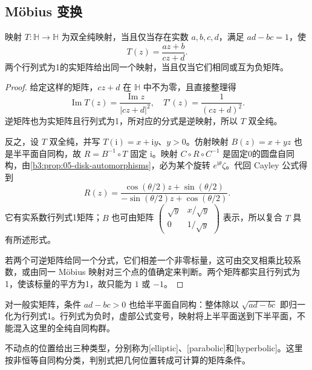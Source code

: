 \subsection{Möbius 变换}
\label{b3:subsec:110402}

\begin{proposition}[上半平面自同构]\label{b3:prop:11-halfplane-automorphisms}
映射 \(T:\mathbb H\to\mathbb H\) 为双全纯映射，当且仅当存在实数 \(a,b,c,d\)，满足 \(ad-bc=1\)，使
\[
 T(z)=\frac{az+b}{cz+d}.
\]
两个行列式为1的实矩阵给出同一个映射，当且仅当它们相同或互为负矩阵。
\end{proposition}
\begin{proof}
给定这样的矩阵，\(cz+d\) 在 \(\mathbb H\) 中不为零，且直接整理得
\[
 \operatorname{Im}T(z)=\frac{\operatorname{Im}z}{|cz+d|^2},
 \quad T'(z)=\frac1{(cz+d)^2}.
\]
逆矩阵也为实矩阵且行列式为1，所对应的分式是逆映射，所以 \(T\) 双全纯。

反之，设 \(T\) 双全纯，并写 \(T(\mathrm{i})=x+\mathrm{i}y\)、\(y>0\)。仿射映射 \(B(z)=x+yz\) 也是半平面自同构，故 \(R=B^{-1}\circ T\) 固定 \(\mathrm{i}\)。映射 \(C\circ R\circ C^{-1}\) 是固定0的圆盘自同构，由\cref{b3:prop:05-disk-automorphisms}，必为某个旋转 \(e^{\mathrm{i}\theta}\zeta\)。代回 Cayley 公式得到
\[
 R(z)=
 \frac{\cos(\theta/2)z+\sin(\theta/2)}
      {-\sin(\theta/2)z+\cos(\theta/2)}.
\]
它有实系数行列式1矩阵；\(B\) 也可由矩阵
\(\left(\begin{smallmatrix}\sqrt y&x/\sqrt y\\0&1/\sqrt y\end{smallmatrix}\right)\)
表示，所以复合 \(T\) 具有所述形式。

若两个可逆矩阵给同一个分式，它们相差一个非零标量，这可由交叉相乘比较系数，或由同一 Möbius 映射对三个点的值确定来判断。两个矩阵都实且行列式为1，使该标量的平方为1，故只能为 \(1\) 或 \(-1\)。
\end{proof}
对一般实矩阵，条件 \(ad-bc>0\) 也给半平面自同构：整体除以 \(\sqrt{ad-bc}\) 即归一化为行列式1。行列式为负时，虚部公式变号，映射将上半平面送到下半平面，不能混入这里的全纯自同构群。

不动点的位置给出三种类型，分别称为[elliptic]、[parabolic]和[hyperbolic]。这里按非恒等自同构分类，判别式把几何位置转成可计算的矩阵条件。

